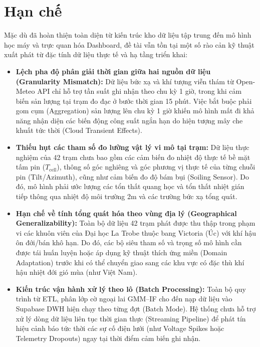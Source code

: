 \documentclass[12pt, a4paper]{report}
\begin{document}
\section{Hạn chế }
\label{sec:limitations}
Mặc dù đã hoàn thiện toàn diện từ kiến trúc kho dữ liệu tập trung đến mô hình học máy và trực quan hóa Dashboard, đề tài vẫn tồn tại một số rào cản kỹ thuật xuất phát từ đặc tính dữ liệu thực tế và hạ tầng triển khai:

\begin{itemize}
    \item \textbf{Lệch pha độ phân giải thời gian giữa hai nguồn dữ liệu (Granularity Mismatch):} Dữ liệu bức xạ và khí tượng viễn thám từ Open-Meteo API chỉ hỗ trợ tần suất ghi nhận theo chu kỳ 1 giờ, trong khi cảm biến sản lượng tại trạm đo đạc ở bước thời gian 15 phút. Việc bắt buộc phải gom cụm (Aggregation) sản lượng lên chu kỳ 1 giờ khiến mô hình mất đi khả năng nhận diện các biến động công suất ngắn hạn do hiện tượng mây che khuất tức thời (Cloud Transient Effects).
    \item \textbf{Thiếu hụt các tham số đo lường vật lý vi mô tại trạm:} Dữ liệu thực nghiệm của 42 trạm chưa bao gồm các cảm biến đo nhiệt độ thực tế bề mặt tấm pin ($T_{\text{cell}}$), thông số góc nghiêng và góc phương vị thực tế của từng chuỗi pin (Tilt/Azimuth), cũng như cảm biến đo độ bám bụi (Soiling Sensor). Do đó, mô hình phải ước lượng các tổn thất quang học và tổn thất nhiệt gián tiếp thông qua nhiệt độ môi trường 2m và các trường bức xạ tổng quát.
    \item \textbf{Hạn chế về tính tổng quát hóa theo vùng địa lý (Geographical Generalizability):} Toàn bộ dữ liệu 42 trạm phát được thu thập trong phạm vi các khuôn viên của Đại học La Trobe thuộc bang Victoria (Úc) với khí hậu ôn đới/bán khô hạn. Do đó, các bộ siêu tham số và trọng số mô hình cần được tái huấn luyện hoặc áp dụng kỹ thuật thích ứng miền (Domain Adaptation) trước khi có thể chuyển giao sang các khu vực có đặc thù khí hậu nhiệt đới gió mùa (như Việt Nam).
    \item \textbf{Kiến trúc vận hành xử lý theo lô (Batch Processing):} Toàn bộ quy trình từ ETL, phân lớp cờ ngoại lai GMM--IF cho đến nạp dữ liệu vào Supabase DWH hiện chạy theo từng đợt (Batch Mode). Hệ thống chưa hỗ trợ xử lý dòng dữ liệu liên tục thời gian thực (Streaming Pipeline) để phát tín hiệu cảnh báo tức thời các sự cố điện lưới (như Voltage Spikes hoặc Telemetry Dropouts) ngay tại thời điểm cảm biến ghi nhận.
\end{itemize}
\end{document}
